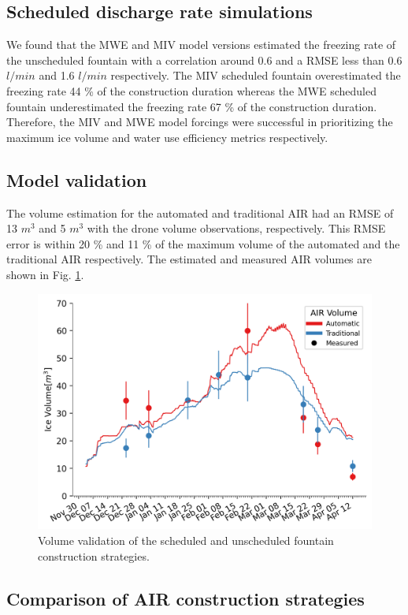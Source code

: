 \documentclass[tc, manuscript]{copernicus}
\begin{document}
\subsection{Scheduled discharge rate simulations}

We found that the MWE and MIV model versions estimated the freezing rate of the unscheduled fountain with a
correlation around 0.6 and a RMSE less than 0.6 $l/min$ and 1.6  $l/min$ respectively. The MIV scheduled
fountain overestimated the freezing rate 44 \% of the construction duration whereas the MWE scheduled fountain
underestimated the freezing rate 67 \% of the construction duration. Therefore, the MIV and MWE model forcings
were successful in prioritizing the maximum ice volume and water use efficiency metrics respectively.

\subsection{Model validation}

The volume estimation for the automated and traditional AIR had an RMSE of 13 $m^3$ and 5 $m^3$ with the drone
volume observations, respectively. This RMSE error is within 20 \% and 11 \% of the maximum volume of the
automated and the traditional AIR respectively. The estimated and measured AIR volumes are shown in Fig.
\ref{fig:validation}.  

\begin{figure}[t] \includegraphics[width=12cm] {Figures/validation.png} \caption{Volume validation of the
scheduled and unscheduled fountain construction strategies.} \label{fig:validation} \end{figure}

\subsection{Comparison of AIR construction strategies}
\end{document}
